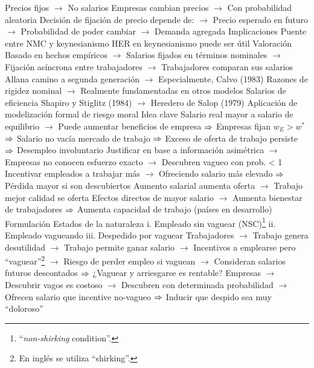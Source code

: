 \documentclass{nuevotema}
\begin{document}
\begin{esquemal}
				\4[] Precios fijos
				\4[] $\to$ No salarios
				\4[] Empresas cambian precios
				\4[] $\to$ Con probabilidad aleatoria
				\4[] Decisión de fijación de precio depende de:
				\4[] $\to$ Precio esperado en futuro
				\4[] $\to$ Probabilidad de poder cambiar
				\4[] $\to$ Demanda agregada
				\4 Implicaciones
				\4[] Puente entre NMC y keynesianismo
				\4[] HER en keynesianismo puede ser útil
				\4 Valoración
				\4[] Basado en hechos empíricos
				\4[] $\to$ Salarios fijados en términos nominales
				\4[] $\to$ Fijación asíncrona entre trabajadores
				\4[] $\to$ Trabajadores comparan sus salarios
				\4[] Allana camino a segunda generación
				\4[] $\to$ Especialmente, Calvo (1983)
				\4[] Razones de rigidez nominal
				\4[] $\to$ Realmente fundamentadas en otros modelos
			\3 Salarios de eficiencia
				\4 Shapiro y Stiglitz (1984)
				\4[] $\to$ Heredero de Salop (1979)
				\4[] Aplicación de modelización formal de riesgo moral
				\4 Idea clave
				\4[] Salario real mayor a salario de equilibrio
				\4[] $\to$ Puede aumentar beneficios de empresa
				\4[] $\Rightarrow$ Empresas fijan $w_E > w^*$
				\4[] $\Rightarrow$ Salario no vacía mercado de trabajo
				\4[] $\Rightarrow$ Exceso de oferta de trabajo persiste
				\4[] $\Rightarrow$ Desempleo involuntario
				\4[] Justificar en base a información asimétrica
				\4[] $\to$ Empresas no conocen esfuerzo exacto
				\4[] $\to$ Descubren vagueo con prob. < 1
				\4[] Incentivar empleados a trabajar más
				\4[] $\to$ Ofreciendo salario más elevado
				\4[] $\Rightarrow$ Pérdida mayor si son descubiertos
				\4[] Aumento salarial aumenta oferta
				\4[] $\to$ Trabajo mejor calidad se oferta
				\4[] Efectos directos de mayor salario
				\4[] $\to$ Aumenta bienestar de trabajadores
				\4[] $\Rightarrow$ Aumenta capacidad de trabajo
				\4[] \quad (países en desarrollo)
				\4 Formulación
				\4[] Estados de la naturaleza
				\4[] i. Empleado sin vaguear (NSC)\footnote{``\textit{non-shirking} condition''.}
				\4[] ii. Empleado vagueando
				\4[] iii. Despedido por vaguear
				\4[] Trabajadores
				\4[] $\to$ Trabajo genera desutilidad
				\4[] $\to$ Trabajo permite ganar salario
				\4[] $\to$ Incentivos a emplearse pero ``vaguear''\footnote{En inglés se utiliza ``shirking''.}
				\4[] $\to$ Riesgo de perder empleo si vaguean
				\4[] $\to$ Consideran salarios futuros descontados
				\4[] $\Rightarrow$ ¿Vaguear y arriesgarse es rentable?
				\4[] Empresas
				\4[] $\to$ Descubrir vagos es costoso
				\4[] $\to$ Descubren con determinada probabilidad
				\4[] $\to$ Ofrecen salario que incentive no-vagueo
				\4[] $\Rightarrow$ Inducir que despido sea muy ``doloroso''

\end{esquemal}
\end{document}
